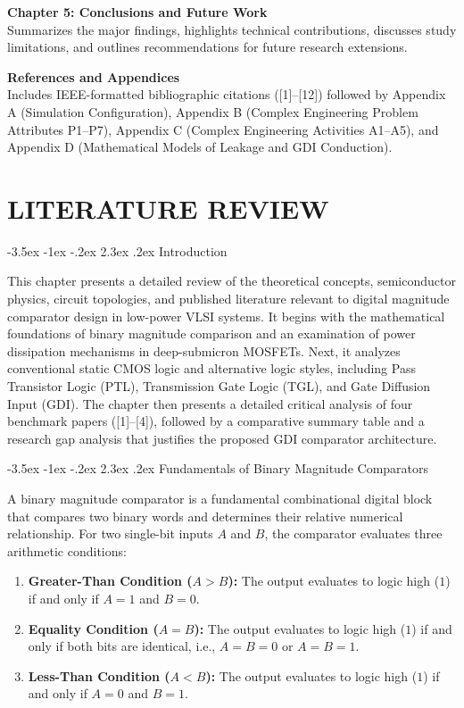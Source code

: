 \documentclass[12pt,a4paper,oneside]{report}
\makeatletter
\renewcommand\section{\@startsection {section}{1}{\z@}%
                                   {-3.5ex \@plus -1ex \@minus -.2ex}%
                                   {2.3ex \@plus.2ex}%
                                   {\normalfont\normalsize\bfseries}}
\makeatother
\begin{document}
\noindent\textbf{Chapter 5: Conclusions and Future Work}\\
Summarizes the major findings, highlights technical contributions, discusses study limitations, and outlines recommendations for future research extensions.

\noindent\textbf{References and Appendices}\\
Includes IEEE-formatted bibliographic citations ([1]--[12]) followed by Appendix A (Simulation Configuration), Appendix B (Complex Engineering Problem Attributes P1--P7), Appendix C (Complex Engineering Activities A1--A5), and Appendix D (Mathematical Models of Leakage and GDI Conduction).


\chapter{LITERATURE REVIEW}

\section{Introduction}

This chapter presents a detailed review of the theoretical concepts, semiconductor physics, circuit topologies, and published literature relevant to digital magnitude comparator design in low-power VLSI systems. It begins with the mathematical foundations of binary magnitude comparison and an examination of power dissipation mechanisms in deep-submicron MOSFETs. Next, it analyzes conventional static CMOS logic and alternative logic styles, including Pass Transistor Logic (PTL), Transmission Gate Logic (TGL), and Gate Diffusion Input (GDI). The chapter then presents a detailed critical analysis of four benchmark papers ([1]--[4]), followed by a comparative summary table and a research gap analysis that justifies the proposed GDI comparator architecture.

\section{Fundamentals of Binary Magnitude Comparators}

A binary magnitude comparator is a fundamental combinational digital block that compares two binary words and determines their relative numerical relationship. For two single-bit inputs $A$ and $B$, the comparator evaluates three arithmetic conditions:
\begin{enumerate}
\item \textbf{Greater-Than Condition ($A>B$):} The output evaluates to logic high ($1$) if and only if $A=1$ and $B=0$.
\item \textbf{Equality Condition ($A=B$):} The output evaluates to logic high ($1$) if and only if both bits are identical, i.e., $A=B=0$ or $A=B=1$.
\item \textbf{Less-Than Condition ($A<B$):} The output evaluates to logic high ($1$) if and only if $A=0$ and $B=1$.
\end{enumerate}
\end{document}
